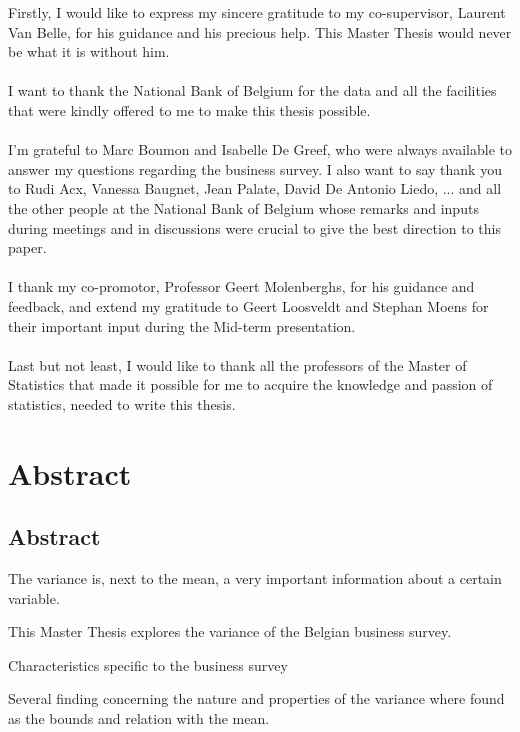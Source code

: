 \documentclass[12pt,a4paper,oneside]{book}
\begin{document}
Firstly, I would like to express my sincere gratitude to my co-supervisor, Laurent Van Belle, for his guidance and his precious help. This Master Thesis would never be what it is without him. \\~\\ 

I want to thank the National Bank of Belgium for the data and all the facilities that were kindly offered to me to make this thesis possible. \\~\\

I'm grateful to Marc Boumon and Isabelle De Greef, who were always available to answer my questions regarding the business survey. 
I also want to say thank you to Rudi Acx, Vanessa Baugnet, Jean Palate, David De Antonio Liedo, ... and all the other people at the National Bank of Belgium whose remarks and inputs during meetings and in discussions were crucial to give the best direction to this paper. \\~\\

I thank my co-promotor, Professor Geert Molenberghs, for his guidance and feedback, and extend my gratitude to Geert Loosveldt and Stephan Moens for their important input during the Mid-term presentation. \\~\\

Last but not least, I would like to thank all the professors of the Master of Statistics that made it possible for me to acquire the knowledge and passion of statistics, needed to write this thesis. 


\chapter*{Abstract}


\section*{Abstract}

The variance is, next to the mean, a very important information about a certain variable.


This Master Thesis explores the variance of the Belgian business survey.

Characteristics specific to the business survey
 
Several finding concerning the nature and properties of the variance where found as the bounds and relation with the mean.
\end{document}
